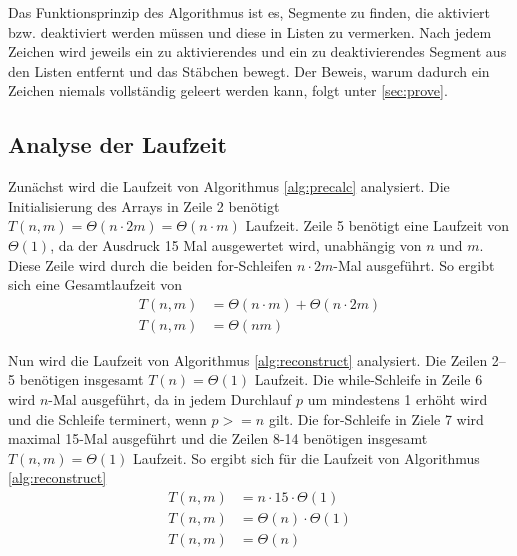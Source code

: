 \documentclass[a4paper,10pt,ngerman]{scrartcl}
\begin{document}
Das Funktionsprinzip des Algorithmus ist es, Segmente zu finden, die aktiviert bzw. deaktiviert werden müssen und diese in Listen zu vermerken. Nach jedem Zeichen wird jeweils ein zu aktivierendes und ein zu deaktivierendes Segment aus den Listen entfernt und das Stäbchen bewegt. Der Beweis, warum dadurch ein Zeichen niemals vollständig geleert werden kann, folgt unter \ref{sec:prove}.
\subsection{Analyse der Laufzeit}
Zunächst wird die Laufzeit von Algorithmus \ref{alg:precalc} analysiert.
Die Initialisierung des Arrays in Zeile 2 benötigt $T(n, m) = \Theta(n \cdot 2 m) = \Theta(n \cdot m)$ Laufzeit.
Zeile 5 benötigt eine Laufzeit von $\Theta(1)$, da der Ausdruck 15 Mal ausgewertet wird, unabhängig von $n$ und $m$.
Diese Zeile wird durch die beiden for-Schleifen $n \cdot 2m$-Mal ausgeführt. 
So ergibt sich eine Gesamtlaufzeit von 
\begin{align*}
    T(n, m) &= \Theta(n \cdot m) + \Theta(n \cdot 2m)\\
    T(n, m) &= \Theta(nm)
\end{align*}

Nun wird die Laufzeit von Algorithmus \ref{alg:reconstruct} analysiert.
Die Zeilen 2–5 benötigen insgesamt $T(n) = \Theta(1)$ Laufzeit. 
Die while-Schleife in Zeile 6 wird $n$-Mal ausgeführt, da in jedem Durchlauf $p$ um mindestens 1 erhöht wird und die Schleife terminert, wenn $p >= n$ gilt. 
Die for-Schleife in Ziele 7 wird maximal 15-Mal ausgeführt und die Zeilen 8-14 benötigen insgesamt $T(n,m) = \Theta(1)$ Laufzeit. 
So ergibt sich für die Laufzeit von Algorithmus \ref{alg:reconstruct}
\begin{align*}
    T(n,m) &= n \cdot 15 \cdot \Theta(1)\\
    T(n, m) &= \Theta(n) \cdot \Theta(1)\\
    T(n, m) &= \Theta(n)
\end{align*}
\end{document}
